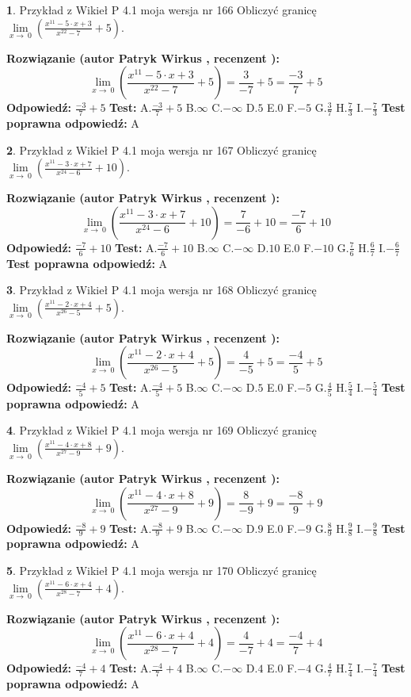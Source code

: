 \documentclass[12pt, a4paper]{article}
\theoremstyle{definition} %
\newtheorem{zad}{}
\newcommand{\zadStart}[1]{\begin{zad}#1\newline}
\newcommand{\zadStop}{\end{zad}}
\newcommand{\rozwStart}[2]{\noindent \textbf{Rozwiązanie (autor #1 , recenzent #2): }\newline}
\newcommand{\rozwStop}{\newline}
\newcommand{\odpStart}{\noindent \textbf{Odpowiedź:}\newline}
\newcommand{\odpStop}{\newline}
\newcommand{\testStart}{\noindent \textbf{Test:}\newline}
\newcommand{\testStop}{\newline}
\newcommand{\kluczStart}{\noindent \textbf{Test poprawna odpowiedź:}\newline}
\newcommand{\kluczStop}{\newline}
\begin{document}
\zadStart{Przykład z Wikieł P 4.1 moja wersja nr 166}
Obliczyć granicę $\lim\limits_{x\to\ 0}(\frac{x^{11}-5 \cdot x +3}{x^{22}-7}+5)$.
\zadStop
\rozwStart{Patryk Wirkus}{}
$$\lim\limits_{x\to\ 0}(\frac{x^{11}-5 \cdot x +3}{x^{22}-7}+5)=\frac{3}{-7}+5=\frac{-3}{7}+5$$
\rozwStop
\odpStart
$\frac{-3}{7}+5$
\odpStop
\testStart
A.$\frac{-3}{7}+5$
B.$\infty$
C.$-\infty$
D.$5$
E.$0$
F.$-5$
G.$\frac{3}{7}$
H.$\frac{7}{3}$
I.$-\frac{7}{3}$
\testStop
\kluczStart
A
\kluczStop



\zadStart{Przykład z Wikieł P 4.1 moja wersja nr 167}
Obliczyć granicę $\lim\limits_{x\to\ 0}(\frac{x^{11}-3 \cdot x +7}{x^{24}-6}+10)$.
\zadStop
\rozwStart{Patryk Wirkus}{}
$$\lim\limits_{x\to\ 0}(\frac{x^{11}-3 \cdot x +7}{x^{24}-6}+10)=\frac{7}{-6}+10=\frac{-7}{6}+10$$
\rozwStop
\odpStart
$\frac{-7}{6}+10$
\odpStop
\testStart
A.$\frac{-7}{6}+10$
B.$\infty$
C.$-\infty$
D.$10$
E.$0$
F.$-10$
G.$\frac{7}{6}$
H.$\frac{6}{7}$
I.$-\frac{6}{7}$
\testStop
\kluczStart
A
\kluczStop



\zadStart{Przykład z Wikieł P 4.1 moja wersja nr 168}
Obliczyć granicę $\lim\limits_{x\to\ 0}(\frac{x^{11}-2 \cdot x +4}{x^{26}-5}+5)$.
\zadStop
\rozwStart{Patryk Wirkus}{}
$$\lim\limits_{x\to\ 0}(\frac{x^{11}-2 \cdot x +4}{x^{26}-5}+5)=\frac{4}{-5}+5=\frac{-4}{5}+5$$
\rozwStop
\odpStart
$\frac{-4}{5}+5$
\odpStop
\testStart
A.$\frac{-4}{5}+5$
B.$\infty$
C.$-\infty$
D.$5$
E.$0$
F.$-5$
G.$\frac{4}{5}$
H.$\frac{5}{4}$
I.$-\frac{5}{4}$
\testStop
\kluczStart
A
\kluczStop



\zadStart{Przykład z Wikieł P 4.1 moja wersja nr 169}
Obliczyć granicę $\lim\limits_{x\to\ 0}(\frac{x^{11}-4 \cdot x +8}{x^{27}-9}+9)$.
\zadStop
\rozwStart{Patryk Wirkus}{}
$$\lim\limits_{x\to\ 0}(\frac{x^{11}-4 \cdot x +8}{x^{27}-9}+9)=\frac{8}{-9}+9=\frac{-8}{9}+9$$
\rozwStop
\odpStart
$\frac{-8}{9}+9$
\odpStop
\testStart
A.$\frac{-8}{9}+9$
B.$\infty$
C.$-\infty$
D.$9$
E.$0$
F.$-9$
G.$\frac{8}{9}$
H.$\frac{9}{8}$
I.$-\frac{9}{8}$
\testStop
\kluczStart
A
\kluczStop



\zadStart{Przykład z Wikieł P 4.1 moja wersja nr 170}
Obliczyć granicę $\lim\limits_{x\to\ 0}(\frac{x^{11}-6 \cdot x +4}{x^{28}-7}+4)$.
\zadStop
\rozwStart{Patryk Wirkus}{}
$$\lim\limits_{x\to\ 0}(\frac{x^{11}-6 \cdot x +4}{x^{28}-7}+4)=\frac{4}{-7}+4=\frac{-4}{7}+4$$
\rozwStop
\odpStart
$\frac{-4}{7}+4$
\odpStop
\testStart
A.$\frac{-4}{7}+4$
B.$\infty$
C.$-\infty$
D.$4$
E.$0$
F.$-4$
G.$\frac{4}{7}$
H.$\frac{7}{4}$
I.$-\frac{7}{4}$
\testStop
\kluczStart
A
\kluczStop
\end{document}
